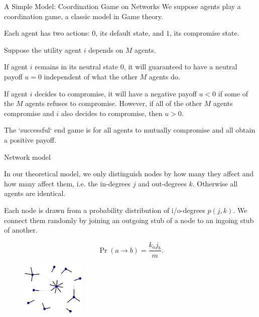 \documentclass[10pt]{beamer}
\begin{document}
\begin{frame}{A Simple Model: Coordination Game on Networks}
We suppose agents play a coordination game, a classic model in Game theory.

Each agent has two actions: $0$, its default state, and $1$, its compromise state.

Suppose the utility agent $i$ depends on $M$ agents.

If agent $i$ remains in its neutral state $0$, it will guaranteed to have a neutral payoff $u = 0$ independent of what the other $M$ agents do.

If agent $i$ decides to compromise, it will have a negative payoff $u <0$ if some of the $M$ agents refuses to compromise. However, if all of the other $M$ agents compromise and $i$ also decides to compromise, then $u >0$.

The `successful` end game is for all agents to mutually compromise and all obtain a positive payoff.
\end{frame}

\begin{frame}{Network model}

In our theoretical model, we only distinguish nodes by how many they affect and how many affect them, i.e. the in-degrees $j$ and out-degrees $k$. Otherwise all agents are identical.

Each node is drawn from a probability distribution of i/o-degrees $p(j,k)$. We connect them randomly by joining an outgoing stub of a node to an ingoing stub of another.

\begin{equation}
\Pr(a \to b) = \frac{k_aj_b}{m}.
\end{equation}

\begin{figure}[b]
\centering
\includegraphics[height=1in]{configuration_model_algorithm.png}
\end{figure}

\end{frame}
\end{document}
